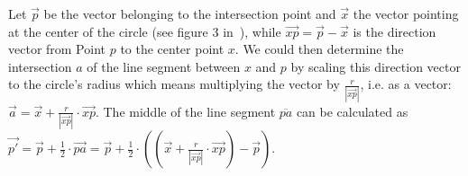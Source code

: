 Let $\vec{p}$ be the vector belonging to the intersection point and $\vec{x}$ the vector pointing at the center of the circle (see figure 3 in~\cite[p. 264]{kuruoglu2009aml}), while $\vec{xp} = \vec{p} - \vec{x}$ is the direction vector from Point $p$ to the center point $x$. We could then determine the intersection $a$ of the line segment between $x$ and $p$ by scaling this direction vector to the circle's radius which means multiplying the vector by $\frac{r}{\left| \vec{xp} \right|}$, i.e. as a vector: $\vec{a} = \vec{x} + \frac{r}{\left| \vec{xp}\right| } \cdot \vec{xp}$. The middle of the line segment $\overline{pa}$ can be calculated as $\vec{p'} = \vec{p} + \frac{1}{2} \cdot \vec{pa} = \vec{p} + \frac{1}{2} \cdot \left( \left( \vec{x} + \frac{r}{\left|\vec{xp}\right|} \cdot \vec{xp} \right) - \vec{p} \right)$.